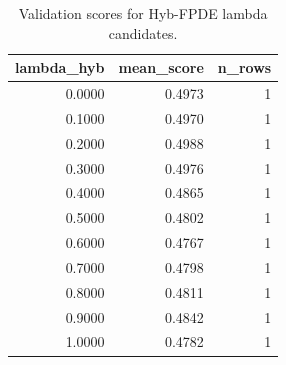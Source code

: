 \begin{table}[t]
\caption{Validation scores for Hyb-FPDE lambda candidates.}
\label{tab:lambda_distribution_computed}
\centering
\begin{tabular}{rrr}
\toprule
lambda\_hyb & mean\_score & n\_rows \\
\midrule
0.0000 & 0.4973 & 1 \\
0.1000 & 0.4970 & 1 \\
0.2000 & 0.4988 & 1 \\
0.3000 & 0.4976 & 1 \\
0.4000 & 0.4865 & 1 \\
0.5000 & 0.4802 & 1 \\
0.6000 & 0.4767 & 1 \\
0.7000 & 0.4798 & 1 \\
0.8000 & 0.4811 & 1 \\
0.9000 & 0.4842 & 1 \\
1.0000 & 0.4782 & 1 \\
\bottomrule
\end{tabular}

\end{table}
